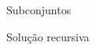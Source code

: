 \begin{frame}{Subconjuntos}

    \begin{block}{Solução recursiva}
        \footnotesize
        \inputminted{cpp}{codigos/subsets-recursivo.cpp}    
    \end{block}

\end{frame}

